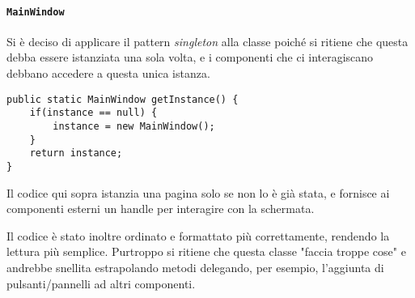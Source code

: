 \documentclass{article}
\begin{document}
\paragraph{\texttt{MainWindow}} Si è deciso di applicare il pattern \textit{singleton} alla classe poiché si ritiene che questa debba essere istanziata una sola volta, e i componenti che ci interagiscano debbano accedere a questa unica istanza.  
\begin{code*}{}
\begin{verbatim}
public static MainWindow getInstance() {
    if(instance == null) {
    	instance = new MainWindow();
    }
    return instance;
}

\end{verbatim}
\end{code*}

Il codice qui sopra istanzia una pagina solo se non lo è già stata, e fornisce ai componenti esterni un handle per interagire con la schermata. \newline 


Il codice è stato inoltre ordinato e formattato più correttamente, rendendo la lettura più semplice. Purtroppo si ritiene che questa classe "faccia troppe cose" e andrebbe snellita estrapolando metodi delegando, per esempio, l'aggiunta di pulsanti/pannelli ad altri componenti. 
\end{document}
